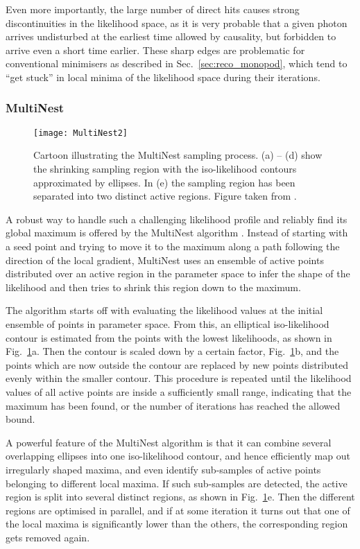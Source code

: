 Even more importantly, the large number of direct hits causes strong
discontinuities in the likelihood space, as it is very probable that a given
photon arrives undisturbed at the earliest time allowed by causality, but
forbidden to arrive even a short time earlier. These sharp edges are
problematic for conventional minimisers as described in
Sec.~\ref{sec:reco_monopod}, which tend to ``get stuck'' in local minima of the
likelihood space during their iterations.

\subsubsection{MultiNest}

\begin{figure}[ht]
 \centering
 \texttt{[image: MultiNest2]}
\caption{Cartoon illustrating the MultiNest sampling process. (a) -- (d) show
  the shrinking sampling region with the iso-likelihood contours approximated
  by ellipses. In (e) the sampling region has been separated into two  distinct
  active regions. Figure taken from \cite{MultiNest1}.}
\label{fig:MultiNest_process}
\end{figure}

A robust way to handle such a challenging likelihood profile and reliably find
its global maximum is offered by the MultiNest algorithm \cite{MultiNest1,
MultiNest2}. Instead of starting with a seed point and trying to move it to
the maximum along a path following the direction of the local gradient,
MultiNest uses an ensemble of active points distributed over an active region
in the parameter space to infer the shape of the likelihood and then tries to
shrink this region down to the maximum.

The algorithm starts off with evaluating the likelihood values at the initial
ensemble of points in parameter space. From this, an elliptical iso-likelihood
contour is estimated from the points with the lowest likelihoods, as shown in
Fig.~\ref{fig:MultiNest_process}a. Then the contour is scaled down by a certain
factor, Fig.~\ref{fig:MultiNest_process}b, and the points which are now outside
the contour are replaced by new points distributed evenly within the smaller
contour. This procedure is repeated until the likelihood values of all active
points are inside a sufficiently small range, indicating that the maximum has
been found, or the number of iterations has reached the allowed bound.

A powerful feature of the MultiNest algorithm is that it can combine several
overlapping ellipses into one iso-likelihood contour, and hence efficiently map
out irregularly shaped maxima, and even identify sub-samples of active points
belonging to different local maxima. If such sub-samples are detected, the
active region is split into several distinct regions, as shown in
Fig.~\ref{fig:MultiNest_process}e. Then the different regions are optimised in
parallel, and if at some iteration it turns out that one of the local maxima is
significantly lower than the others, the corresponding region gets removed
again.

